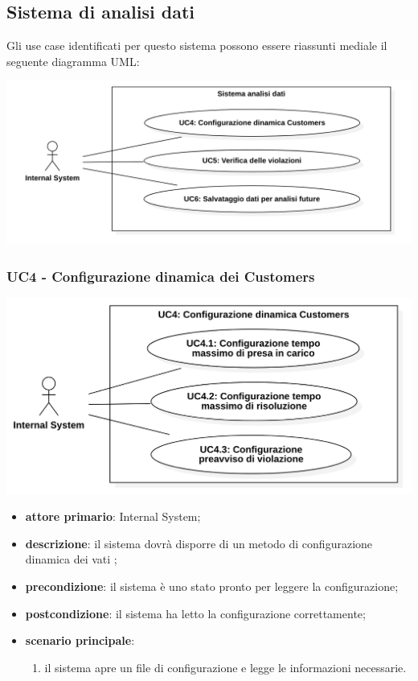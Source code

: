 \subsection{Sistema di analisi dati}
Gli use case identificati per questo sistema possono essere riassunti mediale il seguente diagramma UML:
\begin{center}
	\includegraphics[keepaspectratio = true, width=15cm]{immagini/uc/3.png}
\end{center}
\subsubsection{UC4 - Configurazione dinamica dei Customers}
\begin{center}
	\includegraphics[keepaspectratio = true, width=15cm]{immagini/uc/4.png}
\end{center}
\begin{itemize}
	\item \textbf{attore primario}: Internal System;
	\item \textbf{descrizione}: il sistema dovrà disporre di un metodo di configurazione dinamica dei vati  ;
	\item \textbf{precondizione}: il sistema è uno stato pronto per leggere la configurazione;
	\item \textbf{postcondizione}: il sistema ha letto la configurazione correttamente;
	\item \textbf{scenario principale}: 
	\begin{enumerate}
		\item il sistema apre un file di configurazione e legge le informazioni necessarie.
	\end{enumerate}
\end{itemize}
